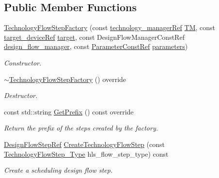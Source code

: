 \subsection*{Public Member Functions}
\begin{DoxyCompactItemize}
\item 
\hyperlink{classTechnologyFlowStepFactory_a6e82bde59f8e24bfa80765bf8d9085d5}{Technology\+Flow\+Step\+Factory} (const \hyperlink{technology__manager_8hpp_a4b9ecd440c804109c962654f9227244e}{technology\+\_\+manager\+Ref} \hyperlink{classTechnologyFlowStepFactory_ab515494e57323a3f703c670bf75bb84c}{TM}, const \hyperlink{target__device_8hpp_acedb2b7a617e27e6354a8049fee44eda}{target\+\_\+device\+Ref} \hyperlink{classTechnologyFlowStepFactory_a798bf9e7a0e488fb3ede977df87feb1c}{target}, const Design\+Flow\+Manager\+Const\+Ref \hyperlink{classDesignFlowStepFactory_ae7854875d87ed8d2fb4d82b2fa017b79}{design\+\_\+flow\+\_\+manager}, const \hyperlink{Parameter_8hpp_a37841774a6fcb479b597fdf8955eb4ea}{Parameter\+Const\+Ref} \hyperlink{classDesignFlowStepFactory_ab2c8bba23db9f4066e1a27ee7157c2de}{parameters})
\begin{DoxyCompactList}\small\item\em Constructor. \end{DoxyCompactList}\item 
\hyperlink{classTechnologyFlowStepFactory_a5cbc1b73d7e126301a67a631febafedd}{$\sim$\+Technology\+Flow\+Step\+Factory} () override
\begin{DoxyCompactList}\small\item\em Destructor. \end{DoxyCompactList}\item 
const std\+::string \hyperlink{classTechnologyFlowStepFactory_a072cf55c638fc7b1940fa4521b38b9f2}{Get\+Prefix} () const override
\begin{DoxyCompactList}\small\item\em Return the prefix of the steps created by the factory. \end{DoxyCompactList}\item 
\hyperlink{design__flow__step_8hpp_a9dd6b4474ddf52d41a78b1aaa12ae6c8}{Design\+Flow\+Step\+Ref} \hyperlink{classTechnologyFlowStepFactory_a904613e01cfbfeccb66bb9218f3e99a5}{Create\+Technology\+Flow\+Step} (const \hyperlink{technology__flow__step_8hpp_a65208cfec963a7d7def292f9db428292}{Technology\+Flow\+Step\+\_\+\+Type} hls\+\_\+flow\+\_\+step\+\_\+type) const
\begin{DoxyCompactList}\small\item\em Create a scheduling design flow step. \end{DoxyCompactList}\end{DoxyCompactItemize}
